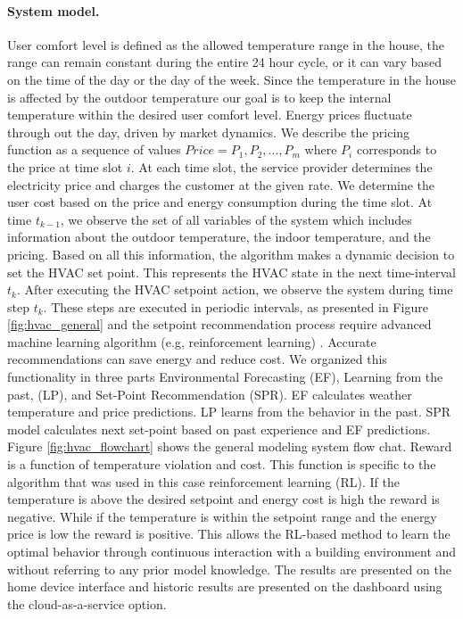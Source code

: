 \paragraph*{System model.}
User comfort level is defined as the allowed temperature range in the house, the range can remain constant during the entire 24 hour cycle, or it can vary based on the time of the day or the day of the week. Since the temperature in the house is affected by the outdoor temperature our goal is to keep the internal temperature within the desired user comfort level. 
Energy prices fluctuate through out the day, driven by market dynamics. We describe the pricing function as a sequence of values $Price = {P_1, P_2, . . . , P_m}$ where $P_i$ corresponds to the price at time slot $i$. At each time slot, the service provider determines the electricity price and charges the customer at the given rate. We determine the user cost based on the price and energy consumption during the time slot. At time $t_{k-1}$, we observe the set of all variables of the system which includes information about the outdoor temperature, the indoor temperature, and the pricing. Based on all this information, the  algorithm makes a dynamic decision to set the HVAC set point. This represents the HVAC state in the next time-interval $t_k$. After executing the HVAC setpoint action, we observe the system during time step $t_k$. These steps are executed in periodic intervals, as presented in Figure \ref{fig:hvac_general} and the setpoint recommendation process require advanced machine learning algorithm (e.g, reinforcement learning) \cite{kotevska2020rl}. Accurate recommendations can save energy and reduce cost. We organized this functionality in three parts Environmental Forecasting (EF), Learning from the past, (LP), and Set-Point Recommendation (SPR). EF calculates weather temperature and price predictions. LP learns from the behavior in the past. SPR model calculates next set-point based on past experience and EF predictions. Figure \ref{fig:hvac_flowchart} shows the general modeling system flow chat. Reward is a function of temperature violation and cost. This function is specific to the algorithm that was used in this case reinforcement learning (RL). If the temperature is above the desired setpoint and energy cost is high the reward is negative. While if the temperature is within the setpoint range and the energy price is low the reward is positive. This allows the RL-based method to learn the optimal behavior through continuous interaction with a building environment and without referring to any prior model knowledge.
The results are presented on the home device interface and historic results are presented on the dashboard using the cloud-as-a-service option.

